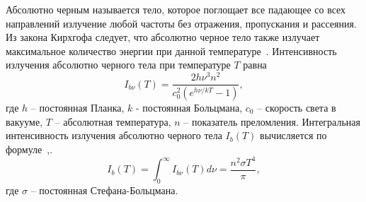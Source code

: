 Абсолютно черным называется тело, которое поглощает все падающее
со всех направлений излучение любой частоты без отражения, пропускания и
рассеяния.
Из закона Кирхгофа следует, что абсолютно черное тело также излучает
максимальное количество энергии при данной
температуре~\cite[25]{Ozisik1976}\cite[5]{modest2013radiative}.
Интенсивность излучения абсолютно черного тела при температуре $T$ равна
\[
    I_{b\nu}(T) = \frac{2h \nu^3 n^2}{c^2_0(e^{h\nu/kT} - 1)},
\]
где $h$ -- постоянная Планка, $k$ - постоянная Больцмана, $c_0$ -- скорость света в вакууме,
$T$ -- абсолютная температура, $n$ -- показатель преломления.
Интегральная интенсивность излучения абсолютно черного тела $I_b(T)$
вычисляется по формуле~\cite[28]{Ozisik1976},\cite[10]{modest2013radiative}.
\[
    I_b(T) = \int^{\infty}_0 I_{b\nu}(T) d\nu = \frac{n^2 \sigma T^4}{\pi},
\]
где $\sigma$ -- постоянная Стефана-Больцмана.


